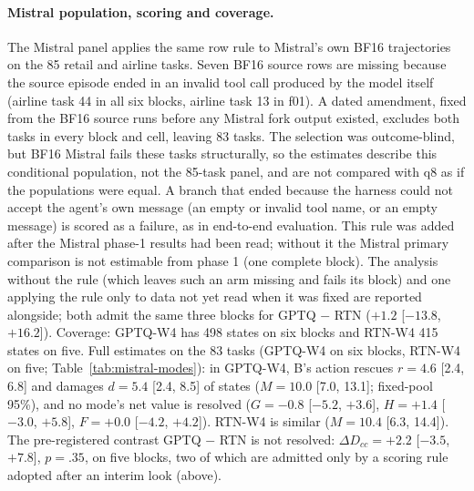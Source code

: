 \paragraph{Mistral population, scoring and coverage.} The Mistral panel applies the same row rule to Mistral's own BF16 trajectories on the 85 retail and airline tasks. Seven BF16 source rows are missing because the source episode ended in an invalid tool call produced by the model itself (airline task 44 in all six blocks, airline task 13 in f01). A dated amendment, fixed from the BF16 source runs before any Mistral fork output existed, excludes both tasks in every block and cell, leaving 83 tasks. The selection was outcome-blind, but BF16 Mistral fails these tasks structurally, so the estimates describe this conditional population, not the 85-task panel, and are not compared with q8 as if the populations were equal. %
A branch that ended because the harness could not accept the agent's own message (an empty or invalid tool name, or an empty message) is scored as a failure, as in end-to-end evaluation. This rule was added after the Mistral phase-1 results had been read; without it the Mistral primary comparison is not estimable from phase 1 (one complete block). The analysis without the rule (which leaves such an arm missing and fails its block) and one applying the rule only to data not yet read when it was fixed are reported alongside; both admit the same three blocks for GPTQ $-$ RTN ($+1.2$ [$-13.8$, $+16.2$]). Coverage: GPTQ-W4 has 498 states on six blocks and RTN-W4 415 states on five. %
Full estimates on the 83 tasks (GPTQ-W4 on six blocks, RTN-W4 on five; Table~\ref{tab:mistral-modes}): in GPTQ-W4, B's action rescues $r=4.6$ [2.4, 6.8] and damages $d=5.4$ [2.4, 8.5]\pp{} of states ($M=10.0$ [7.0, 13.1]; fixed-pool 95\%), and no mode's net value is resolved ($G=-0.8$ [$-5.2$, $+3.6$], $H=+1.4$ [$-3.0$, $+5.8$], $F=+0.0$ [$-4.2$, $+4.2$]). RTN-W4 is similar ($M=10.4$ [6.3, 14.4]). The pre-registered contrast GPTQ $-$ RTN is not resolved: $\Delta D_{cc}=+2.2$ [$-3.5$, $+7.8$]\pp{}, $p=.35$, on five blocks, two of which are admitted only by a scoring rule adopted after an interim look (above). %


